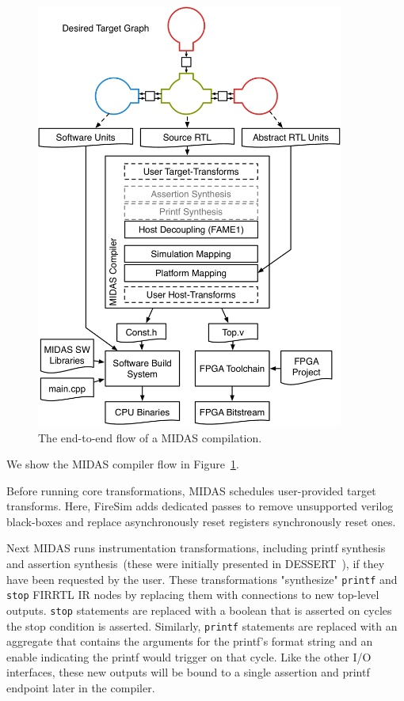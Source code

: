 \begin{figure}
    \centering
    \includegraphics[width=0.9\textwidth]{figures/midas-flow.pdf}
    \caption{The end-to-end flow of a MIDAS compilation.}
    \label{fig:midas-flow}
\end{figure}

We show the MIDAS compiler flow in Figure~\ref{fig:midas-flow}.

Before running core transformations, MIDAS schedules user-provided target transforms.
Here, FireSim adds dedicated passes to remove unsupported verilog black-boxes and
replace asynchronously reset registers synchronously reset ones.

Next MIDAS runs instrumentation transformations, including printf synthesis
and assertion synthesis~(these were initially presented in DESSERT~\cite{DESSERT}), if they have been requested by the user. These
transformations "synthesize" \texttt{printf} and \texttt{stop} FIRRTL IR
nodes by replacing them with connections to new top-level outputs. \texttt{stop} statements are
replaced with a boolean that is asserted on cycles the stop condition is asserted. Similarly, \texttt{printf} statements are replaced with an aggregate that contains
the arguments for the printf's format string and an enable indicating the
printf would trigger on that cycle. Like the other I/O interfaces, these new outputs will be bound to a single assertion
and printf endpoint later in the compiler.

